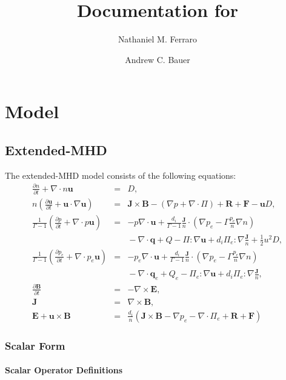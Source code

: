 \documentclass[letterpaper]{book}
\title{Documentation for \codename}
\author{Nathaniel M. Ferraro \and Andrew C. Bauer}
\newcommand{\ddt}[1]{\frac{\partial #1}{\partial t}}
\renewcommand{\vec}[1]{\ensuremath{\mathbf{#1}}}
\newcommand{\tensor}[1]{\mathsf{#1}}
\newcommand{\B}{\vec{B}}
\newcommand{\E}{\vec{E}}
\newcommand{\R}{\vec{R}}
\renewcommand{\u}{\vec{u}}
\newcommand{\F}{\vec{F}}
\renewcommand{\j}{\vec{J}}
\newcommand{\q}{\vec{q}}
\newcommand{\jn}{\frac{\j}{n}}
\renewcommand{\P}{\tensor{\Pi}}
\renewcommand{\div}[1]{\nabla \cdot #1}
\newcommand{\curl}[1]{\nabla \times #1}
\newcommand{\dotdot}{:}
\begin{document}
\maketitle

\tableofcontents

\chapter{Model}

\section{Extended-MHD}

The extended-MHD model consists of the following equations:
\begin{subequations} \label{eq:xmhd}
\begin{eqnarray}
  \label{eq:continuity}
  \ddt{n} + \div n \u & = & D,
  \\
  \label{eq:momentum}
  n \left( \ddt{\u} + \u \cdot \nabla \u \right) 
  & = & \j \times \B - (\nabla p + \div \P) + \R + \F - \u D,
  \\
  \frac{1}{\Gamma-1} \left( \ddt{p} + \div{p\u} \right)
  & = & -p \div\u +
  \frac{d_i}{\Gamma-1}\jn\cdot\left(\nabla p_e -
  \Gamma \frac{p_e}{n}\nabla n \right)
  \\ & & \mbox{}
  - \div{\q} + Q - \P\dotdot\nabla \u + d_i \P_e\dotdot\nabla \jn + \frac{1}{2} u^2 D,
  \nonumber \\
  \frac{1}{\Gamma-1} \left( \ddt{p_e} + \div{p_e\u} \right)
  & = & -p_e \div\u +
  \frac{d_i}{\Gamma-1}\jn\cdot\left(\nabla p_e -
  \Gamma \frac{p_e}{n}\nabla n \right)
  \\ & & \mbox{} 
  - \div{\q_e} + Q_e - \P_e\dotdot\nabla \u + d_i \P_e\dotdot\nabla \jn,
  \nonumber 
  \\
  \label{eq:Faraday}
  \ddt{\B} & = & -\curl \E,
  \\
  \j & = &\curl \B,
  \\
  \label{eq:ohm}
  \E + \u \times \B & = &  
  \frac{d_i}{n} \left(\j\times\B - \nabla p_e 
  - \div{\P_e} + \R + \F \right)
\end{eqnarray}
\end{subequations}


\subsection{Scalar Form}

\subsubsection{Scalar Operator Definitions}
\end{document}
